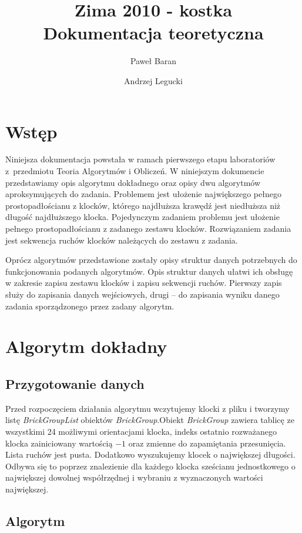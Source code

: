 \documentclass[12pt]{article}
\title{
\Huge{
Zima 2010 - kostka
} \\[0.5em]
\LARGE{
Dokumentacja teoretyczna
}
}
\author{
	Paweł Baran \and Andrzej Legucki
}
\begin{document}
\maketitle

\newpage

\tableofcontents

\newpage
\section{Wstęp}
Niniejsza dokumentacja powstała w ramach pierwszego etapu laboratoriów
z~przedmiotu Teoria Algorytmów i Obliczeń. W niniejszym dokumencie
przedstawiamy opis algorytmu dokładnego oraz opisy dwu algorytmów
aproksymujących do zadania. Problemem jest ułożenie największego
pełnego prostopadłościanu z klocków, którego najdłuższa krawędź jest niedłuższa niż
długość najdłuższego klocka. Pojedynczym zadaniem problemu jest
ułożenie pełnego prostopadłościanu z zadanego zestawu klocków.
Rozwiązaniem zadania jest sekwencja ruchów klocków należących do zestawu
z zadania.

Oprócz algorytmów przedstawione zostały opisy struktur danych potrzebnych
do funkcjonowania podanych algorytmów. Opis struktur danych ułatwi ich
obsługę w zakresie zapisu zestawu klocków i zapisu sekwencji ruchów.
Pierwszy zapis służy do zapisania danych wejściowych, drugi -- do zapisania
wyniku danego zadania sporządzonego przez zadany algorytm.

\section{Algorytm dokładny}
\subsection{Przygotowanie danych}
Przed rozpoczęciem działania algorytmu wczytujemy klocki z pliku i tworzymy listę \textit{BrickGroupList} obiektów
\textit{BrickGroup}.Obiekt \textit{BrickGroup} zawiera tablicę ze wszystkimi 24 możliwymi orientacjami
klocka, indeks ostatnio rozważanego klocka zainiciowany wartością $-1$ oraz zmienne do zapamiętania przesunięcia.
Lista ruchów jest pusta. Dodatkowo wyszukujemy klocek o największej długości. Odbywa się to poprzez znalezienie
dla każdego klocka sześcianu jednostkowego o największej dowolnej współrzędnej i wybraniu z wyznaczonych wartości
największej.
\subsection{Algorytm}
\end{document}
